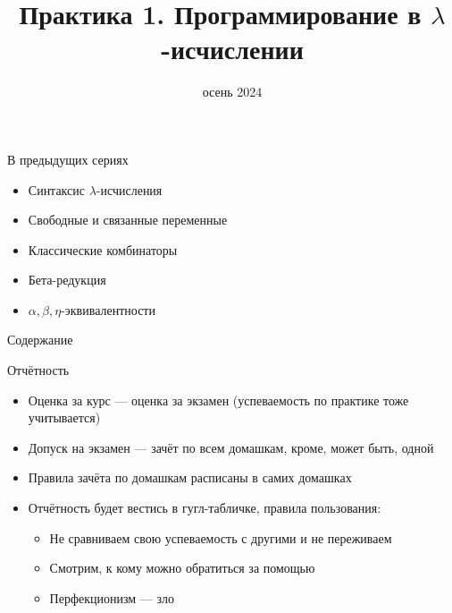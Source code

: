 
\newif\ifhandout




\title[Программирование в $\lambda$-исчислении]{Практика 1. Программирование в $\lambda$-исчислении}
\date{осень 2024}



    \setcounter{framenumber}{-1}
    \maketitle

    \begin{frame}{В предыдущих сериях}
        \begin{itemize}
            \item[\newtopic] Синтаксис $\lambda$-исчисления
            \item[\newtopic] Свободные и связанные переменные
            \item[\newtopic] Классические комбинаторы
            \item[\newtopic] Бета-редукция
            \item[\newtopic] $\alpha, \beta,\eta$-эквивалентности
        \end{itemize}
    \end{frame}

    \begin{frame}[noframenumbering]{Содержание}
        \tableofcontents
    \end{frame}


    \begin{frame}{Отчётность} %
        \begin{itemize}
            \item Оценка за курс --- оценка за экзамен (успеваемость по практике тоже учитывается)
            \item Допуск на экзамен --- зачёт по всем домашкам, кроме, может быть, одной
            \item Правила зачёта по домашкам расписаны в самих домашках
            \item Отчётность будет вестись в гугл-табличке, правила пользования:
            \begin{itemize}
                \item Не сравниваем свою успеваемость с другими и не переживаем
                \item Смотрим, к кому можно обратиться за помощью
                \item Перфекционизм --- зло
            \end{itemize}
        \end{itemize}
    \end{frame}

